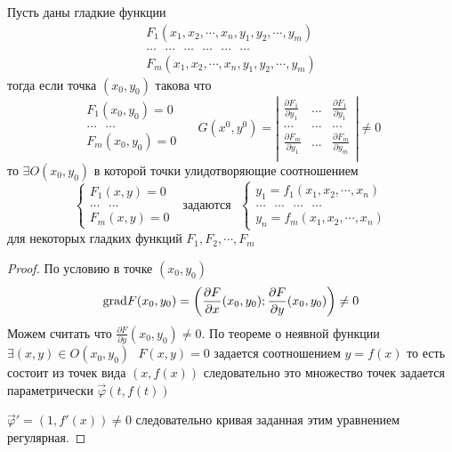 \begin{theorem}
  Пусть  даны гладкие функции
  $$
  \begin{array}{c}
    F_1 (x_1, x_2, \cdots, x_n, y_1, y_2, \cdots, y_m) \\
    \dots ~~~ \dots ~~~ \dots ~~~ \dots  ~~~ \dots ~~~ \dots \\
    F_m (x_1, x_2, \cdots, x_n, y_1, y_2, \cdots, y_m)
  \end{array}
  $$
  тогда если точка $(x_0, y_0)$ такова что
  $$
  \begin{array}{c}
    F_1(x_0, y_0) = 0 \\
    \ldots ~~~ \ldots \\
    F_m(x_0, y_0) = 0 \\
  \end{array} ~~~~~~
  G(x^0, y^0) = \left|
  \begin{array}{ccc}
    \frac{\partial F_1}{\partial y_1} & \dots &
    \frac{\partial F_1}{\partial y_1} \\

    \dots & \dots & \dots \\

    \frac{\partial F_m}{\partial y_1} & \dots &
    \frac{\partial F_m}{\partial y_m} \\
  \end{array}
  \right|
  \not= 0
  $$
  то $\exists O(x_0, y_0)$ в которой точки улидотворяющие соотношением
  $$
  \left\{
  \begin{array}{c}
    F_1(x, y) = 0 \\
    \dots ~~~ \dots \\
    F_m(x, y) = 0
  \end{array}
  \right. ~~~ \text{задаются} ~~~
  \left\{
  \begin{array}{c}
    y_1 = f_1(x_1, x_2, \cdots, x_n)\\
    \dots ~~~ \dots ~~~ \dots ~~~ \dots \\
    y_n = f_m(x_1, x_2, \cdots, x_n)
  \end{array}
  \right.
  $$
  для некоторых гладких функций $F_1, F_2, \cdots, F_m $
\end{theorem}

\begin{proof}
  По условию в точке $(x_0, y_0)$
  $$
  \mathrm{grad} F(x_0, y_0) = \left( \frac{\partial F}{\partial x}(x_0, y_0);
  \frac{\partial F}{\partial y}(x_0, y_0) \right) \not= 0
  $$
  Можем считать что $\frac{\partial F}{\partial y}(x_0, y_0) \not= 0$. По
  теореме о неявной функции $\exists (x, y) \in O(x_0, y_0) ~~~ F(x, y) = 0$
  задается соотношением $y = f(x)$
  то есть состоит из точек вида $(x, f(x))$ следовательно это множество точек
  задается параметрически $\vec \varphi (t, f(t))$

  $\vec \varphi' = (1, f'(x)) \not= 0$ следовательно кривая заданная этим
  уравнением регулярная.
\end{proof}

